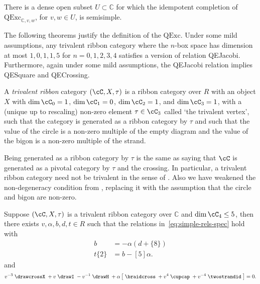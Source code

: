 \documentclass[12pt]{amsart}
\begin{document}

\begin{conjecture}
There is a dense open subset $U \subset \mathbb{C}$ for which the idempotent completion of $\mathrm{QExc}_{\mathbb{C},v,w}$, for $v,w \in U$, is semisimple.
\end{conjecture}



The following theorems justify the definition of the $\mathrm{QExc}$.  Under some mild assumptions, any trivalent ribbon category where the $n$-box space has dimension at most $1,0,1,1,5$ for $n=0,1,2,3,4$ satisfies a version of relation QEJacobi.  Furthermore, again under some mild assumptions, the QEJacobi relation implies QESquare and QECrossing.

\begin{definition}
A \emph{trivalent ribbon} category $(\cC, X, \tau)$ is a ribbon category over $R$ with 
an object $X$ with $\dim \cC_0 = 1$, $\dim \cC_1 = 0$, $\dim{\cC_2} = 1$, and $\dim{\cC_3} = 1$, with a (unique up to rescaling) non-zero element $\tau \in \cC_3$ called `the trivalent vertex', such that the category is generated as a ribbon category by $\tau$ and such that the value of the circle is a non-zero multiple of the empty diagram and the value of the bigon is a non-zero multiple of the strand.
\end{definition}

Being generated as a ribbon category by $\tau$ is the same as saying that $\cC$ is generated as a pivotal category by $\tau$ and the crossing.  In particular, a trivalent ribbon category need not be trivalent in the sense of \cite{MR3624901}.  Also we have weakened the non-degeneracy condition from \cite{MR3624901}, replacing it with the assumption that the circle and bigon are non-zero.

\begin{theorem} \label{thm:Jacobi}
Suppose $(\cC, X, \tau)$ is a trivalent ribbon category over
$\mathbb{C}$ and $\dim{\cC_4} \leq 5$, then there exists $v, \alpha,
b, d, t \in R$ such that the relations in~\eqref{eq:simple-rels-spec}
hold with
\begin{align*}
  [5] b &= - \alpha (d+\{8\}) \\
  t \{2\} &= b-[5] \alpha.
\end{align*}
and
\begin{equation}
v^{-3} \;
\drawcrossX
\;+ v \;
\drawI
\; -v^{-1} \;
 \drawH
\;
 + \alpha
\left[\; \braidcross \;
 + v^{4}\;
\cupcap
\; + v^{-4} \;
 \twostrandid \;
 \right] = 0.\label{eq:quant-except-gen}
\end{equation}
\end{theorem}
\end{document}
